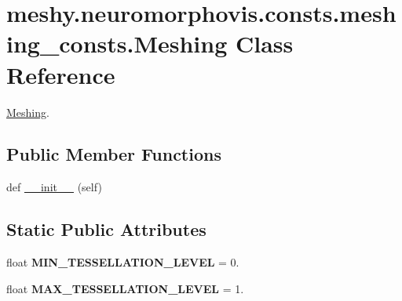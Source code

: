 \hypertarget{classmeshy_1_1neuromorphovis_1_1consts_1_1meshing__consts_1_1Meshing}{}\section{meshy.\+neuromorphovis.\+consts.\+meshing\+\_\+consts.\+Meshing Class Reference}
\label{classmeshy_1_1neuromorphovis_1_1consts_1_1meshing__consts_1_1Meshing}


\hyperlink{classmeshy_1_1neuromorphovis_1_1consts_1_1meshing__consts_1_1Meshing}{Meshing}.  


\subsection*{Public Member Functions}
\begin{DoxyCompactItemize}
\item 
def \hyperlink{classmeshy_1_1neuromorphovis_1_1consts_1_1meshing__consts_1_1Meshing_a7cf94c0985ab8d48451e7e9ea580ab38}{\+\_\+\+\_\+init\+\_\+\+\_\+} (self)\hypertarget{classmeshy_1_1neuromorphovis_1_1consts_1_1meshing__consts_1_1Meshing_a7cf94c0985ab8d48451e7e9ea580ab38}{}\label{classmeshy_1_1neuromorphovis_1_1consts_1_1meshing__consts_1_1Meshing_a7cf94c0985ab8d48451e7e9ea580ab38}

\end{DoxyCompactItemize}
\subsection*{Static Public Attributes}
\begin{DoxyCompactItemize}
\item 
float {\bfseries M\+I\+N\+\_\+\+T\+E\+S\+S\+E\+L\+L\+A\+T\+I\+O\+N\+\_\+\+L\+E\+V\+EL} = 0.\hypertarget{classmeshy_1_1neuromorphovis_1_1consts_1_1meshing__consts_1_1Meshing_a14e5bcfa673d4febb69295d0d2463493}{}\label{classmeshy_1_1neuromorphovis_1_1consts_1_1meshing__consts_1_1Meshing_a14e5bcfa673d4febb69295d0d2463493}

\item 
float {\bfseries M\+A\+X\+\_\+\+T\+E\+S\+S\+E\+L\+L\+A\+T\+I\+O\+N\+\_\+\+L\+E\+V\+EL} = 1.\hypertarget{classmeshy_1_1neuromorphovis_1_1consts_1_1meshing__consts_1_1Meshing_a9dd8754520e5a60b39b1e94d5b8c08a8}{}\label{classmeshy_1_1neuromorphovis_1_1consts_1_1meshing__consts_1_1Meshing_a9dd8754520e5a60b39b1e94d5b8c08a8}

\end{DoxyCompactItemize}


